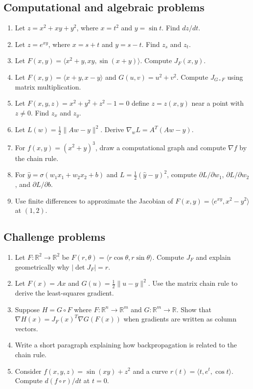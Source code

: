 \documentclass[11pt]{article}
\newcommand{\R}{\mathbb R}
\newcommand{\grad}{\nabla}
\begin{document}
\subsection*{Computational and algebraic problems}
\begin{enumerate}[start=7]
  \item Let $z=x^2+xy+y^2$, where $x=t^2$ and $y=\sin t$. Find $dz/dt$.
  \item Let $z=e^{xy}$, where $x=s+t$ and $y=s-t$. Find $z_s$ and $z_t$.
  \item Let $F(x,y)=\langle x^2+y,xy,\sin(x+y)\rangle$. Compute $J_F(x,y)$.
  \item Let $F(x,y)=\langle x+y,x-y\rangle$ and $G(u,v)=u^2+v^2$. Compute $J_{G\circ F}$ using matrix multiplication.
  \item Let $F(x,y,z)=x^2+y^2+z^2-1=0$ define $z=z(x,y)$ near a point with $z\ne 0$. Find $z_x$ and $z_y$.
  \item Let $L(w)=\frac12\|Aw-y\|^2$. Derive $\grad_w L=A^T(Aw-y)$.
  \item For $f(x,y)=(x^2+y)^3$, draw a computational graph and compute $\grad f$ by the chain rule.
  \item For $\widehat y=\sigma(w_1x_1+w_2x_2+b)$ and $L=\frac12(\widehat y-y)^2$, compute $\partial L/\partial w_1$, $\partial L/\partial w_2$, and $\partial L/\partial b$.
  \item Use finite differences to approximate the Jacobian of $F(x,y)=\langle e^{xy},x^2-y^2\rangle$ at $(1,2)$.
\end{enumerate}

\subsection*{Challenge problems}
\begin{enumerate}[start=16]
  \item Let $F:\R^2\to\R^2$ be $F(r,\theta)=\langle r\cos\theta,r\sin\theta\rangle$. Compute $J_F$ and explain geometrically why $|\det J_F|=r$.
  \item Let $F(x)=Ax$ and $G(u)=\frac12\|u-y\|^2$. Use the matrix chain rule to derive the least-squares gradient.
  \item Suppose $H=G\circ F$ where $F:\R^n\to\R^m$ and $G:\R^m\to\R$. Show that $\grad H(x)=J_F(x)^T\grad G(F(x))$ when gradients are written as column vectors.
  \item Write a short paragraph explaining how backpropagation is related to the chain rule.
  \item Consider $f(x,y,z)=\sin(xy)+z^2$ and a curve $r(t)=\langle t,e^t,\cos t\rangle$. Compute $d(f\circ r)/dt$ at $t=0$.
\end{enumerate}
\end{document}
